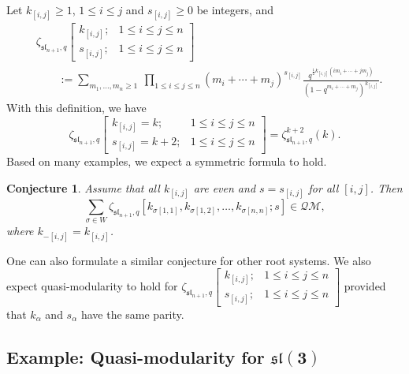 \documentclass[pdftex]{sigma}
\numberwithin{equation}{section}
\newtheorem{Conjecture}[Theorem]{Conjecture}
\theoremstyle{definition}
\begin{document}
Let $k_{[i,j]} \geq 1$, $1 \leq i \leq j$ and $s_{[i,j]} \geq 0$ be integers, and
\begin{align*}
 & \zeta_{\mathfrak{sl}_{n+1},q} \left[ \begin{matrix} k_{[i,j]}; & 1 \leq i \leq j \leq n \\ s_{[i,j]}; & 1 \leq i \leq j \leq n \end{matrix} \right]\nonumber\\
 &\qquad :=\sum_{m_1,\dots,m_n \geq 1} \ \prod_{1 \leq i \leq j \leq n} (m_i+\cdots + m_j)^{s_{[i,j]}} \frac{q^{\frac12 k_{[i,j]} (i m_i+\cdots + j m_j)}}{(1-q^{m_i+\cdots + m_j})^{k_{[i,j]}}}. \label{type-An-alt}
\end{align*}
With this definition, we have
\[
\zeta_{\mathfrak{sl}_{n+1},q} \left[ \begin{matrix} k_{[i,j]} =k; & 1 \leq i \leq j \leq n \\ s_{[i,j]} =k+2; & 1 \leq i \leq j \leq n \end{matrix} \right]
=\zeta_{\mathfrak{sl}_{n+1},q}^{k+2} (k).
\]
Based on many examples, we expect a symmetric formula to hold.

\begin{Conjecture} Assume that all $k_{[i,j]}$ are even and $s=s_{[i,j]}$ for all $[i,j]$. Then
\[
\sum_{\sigma \in W} \zeta_{\mathfrak{sl}_{n+1},q} \left[ k_{\sigma[1,1]},k_{\sigma[1,2]}, \dots, k_{\sigma[n,n]};s \right] \in \mathcal{QM},
\]
where $k_{-[i,j]}=k_{[i,j]}$.
\end{Conjecture}

One can also formulate a similar conjecture for other root systems.
We also expect quasi-modularity to hold for
$\zeta_{\mathfrak{sl}_{n+1},q} \left[ \begin{smallmatrix} k_{[i,j]}; & 1 \leq i \leq j \leq n \\ s_{[i,j]}; & 1 \leq i \leq j \leq n \end{smallmatrix} \right]$
provided that $k_{\alpha}$ and $s_{\alpha}$ have the same parity.


\subsection[Example: Quasi-modularity for sl(3)]{Example: Quasi-modularity for $\boldsymbol{\mathfrak{sl}(3)}$}\label{section3.5}
\end{document}
